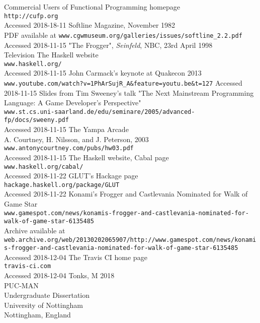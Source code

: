 \documentclass[12pt, a4paper]{report}
\begin{document}
\begin{thebibliography}{0}
    Commercial Users of Functional Programming homepage\\
    \verb|http://cufp.org|\\
    Accessed 2018-18-11
    Softline Magazine, November 1982\\
    PDF available at \verb|www.cgwmuseum.org/galleries/issues/softline_2.2.pdf|\\
    Accessed 2018-11-15
    "The Frogger", \textit{Seinfeld}, NBC, 23rd April 1998\\
    Television
    The Haskell website\\
    \verb|www.haskell.org/|\\
    Accessed 2018-11-15
    John Carmack's keynote at Quakecon 2013\\
    \verb|www.youtube.com/watch?v=1PhArSujR_A&feature=youtu.be&t=127|
    Accessed 2018-11-15
    Slides from Tim Sweeney's talk "The Next Mainstream Programming Language: A Game Developer’s Perspective"\\
    \verb|www.st.cs.uni-saarland.de/edu/seminare/2005/advanced-fp/docs/sweeny.pdf|\\
    Accessed 2018-11-15
    The Yampa Arcade\\
    A. Courtney, H. Nilsson, and J. Peterson, 2003\\
    \verb|www.antonycourtney.com/pubs/hw03.pdf|\\
    Accessed 2018-11-15
    The Haskell website, Cabal page\\
    \verb|www.haskell.org/cabal/|\\
    Accessed 2018-11-22
    GLUT's Hackage page\\
    \verb|hackage.haskell.org/package/GLUT|\\
    Accessed 2018-11-22
    Konami's Frogger and Castlevania Nominated for Walk of Game Star\\
    \verb|www.gamespot.com/news/konamis-frogger-and-castlevania-nominated-for-walk-of-game-star-6135485|\\
    Archive available at \verb|web.archive.org/web/20130202065907/http://www.gamespot.com/news/konamis-frogger-and-castlevania-nominated-for-walk-of-game-star-6135485|\\
    Accessed 2018-12-04
    The Travis CI home page\\
    \verb|travis-ci.com|\\
    Accessed 2018-12-04
    Tonks, M 2018\\
    PUC-MAN\\
    Undergraduate Dissertation\\
    University of Nottingham\\
    Nottingham, England
\end{thebibliography}
\end{document}
